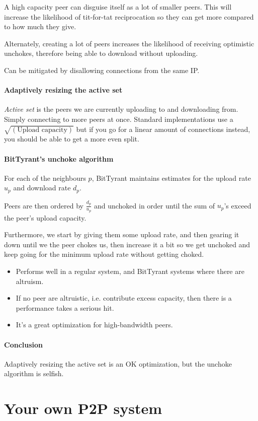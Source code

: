 	A high capacity peer can disguise itself as a lot of smaller peers. This will increase the likelihood of tit-for-tat reciprocation so they can get more compared to how much they give.
	
	Alternately, creating a lot of peers increases the likelihood of receiving optimistic unchokes, therefore being able to download without uploading.
	
	Can be mitigated by disallowing connections from the same IP.
	
	\subsubsection{Adaptively resizing the active set}
	\textit{Active set} is the peers we are currently uploading to and downloading from. Simply connecting to more peers at once. Standard implementations use a $\sqrt{(\text{Upload capacity})}$ but if you go for a linear amount of connections instead, you should be able to get a more even split.
	
	\subsubsection{BitTyrant's unchoke algorithm}
	For each of the neighbours $p$, BitTyrant maintains estimates for the upload rate $u_p$ and download rate $d_p$.
	
	Peers are then ordered by $\frac{d_p}{u_p}$ and unchoked in order until the sum of $u_p$'s exceed the peer's upload capacity.
	
	Furthermore, we start by giving them some upload rate, and then gearing it down until we the peer chokes us, then increase it a bit so we get unchoked and keep going for the minimum upload rate without getting choked.
	
	\begin{itemize}
		\item Performs well in a regular system, and BitTyrant systems where there are altruism.
		\item If no peer are altruistic, i.e. contribute excess capacity, then there is a performance takes a serious hit.
		\item It's a great optimization for high-bandwidth peers.
	\end{itemize}
	
	\subsubsection{Conclusion}
	Adaptively resizing the active set is an OK optimization, but the unchoke algorithm is selfish.
	
	\chapter{Your own P2P system}
	
